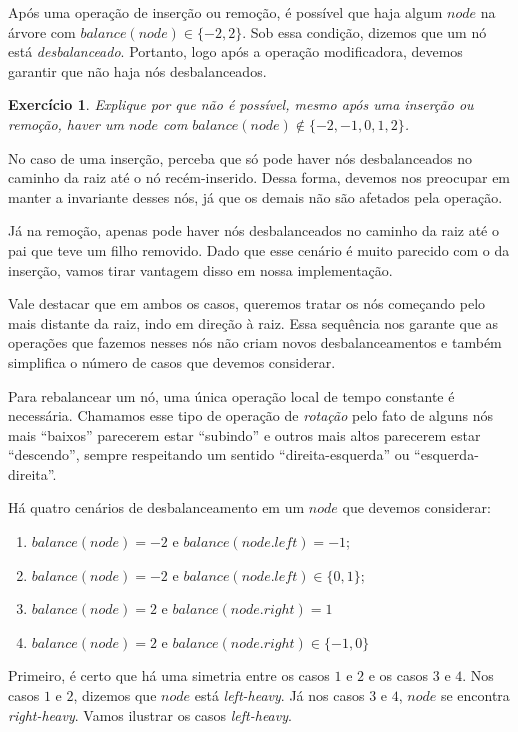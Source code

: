 \documentclass[11pt]{article}
\newtheorem{exercicio}{Exercício}
\begin{document}
Após uma operação de inserção ou remoção, é possível que haja
algum \(node\) na árvore com \(balance(node) \in \{-2, 2\}\).  Sob
essa condição, dizemos que um nó está \emph{desbalanceado}.  Portanto,
logo após a operação modificadora, devemos garantir que não haja
nós desbalanceados.

\begin{exercicio}
Explique por que não é possível, mesmo após uma inserção ou
remoção, haver um \(node\) com \(balance(node) \notin \{-2, -1, 0, 1,
    2\}\).
\end{exercicio}

No caso de uma inserção, perceba que só pode haver nós
desbalanceados no caminho da raiz até o nó recém-inserido.  Dessa
forma, devemos nos preocupar em manter a invariante desses nós, já
que os demais não são afetados pela operação.

Já na remoção, apenas pode haver nós desbalanceados no caminho da
raiz até o pai que teve um filho removido.  Dado que esse cenário
é muito parecido com o da inserção, vamos tirar vantagem disso em
nossa implementação.

Vale destacar que em ambos os casos, queremos tratar os nós
começando pelo mais distante da raiz, indo em direção à raiz.
Essa sequência nos garante que as operações que fazemos nesses nós
não criam novos desbalanceamentos e também simplifica o número de
casos que devemos considerar.

Para rebalancear um nó, uma única operação local de tempo
constante é necessária.  Chamamos esse tipo de operação de
\emph{rotação} pelo fato de alguns nós mais ``baixos'' parecerem estar
``subindo'' e outros mais altos parecerem estar ``descendo'',
sempre respeitando um sentido ``direita-esquerda'' ou
``esquerda-direita''.

Há quatro cenários de desbalanceamento em um \(node\) que devemos
considerar:
\begin{enumerate}
\item \(balance(node) = -2\) e \(balance(node.left) = -1\);
\item \(balance(node) = -2\) e \(balance(node.left) \in \{0, 1\}\);
\item \(balance(node) = 2\) e \(balance(node.right) = 1\)
\item \(balance(node) = 2\) e \(balance(node.right) \in \{-1, 0\}\)
\end{enumerate}

Primeiro, é certo que há uma simetria entre os casos \(1\) e \(2\) e
os casos \(3\) e \(4\). Nos casos \(1\) e \(2\), dizemos que \(node\) está
\emph{left-heavy}.  Já nos casos \(3\) e \(4\), \(node\) se encontra
\emph{right-heavy}.  Vamos ilustrar os casos \emph{left-heavy}.
\end{document}

